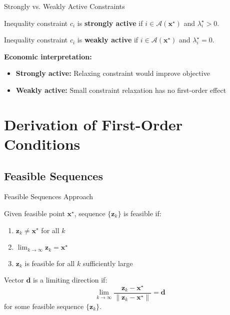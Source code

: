 \documentclass[aspectratio=1610]{beamer}
\begin{document}
\begin{frame}{Strongly vs. Weakly Active Constraints}
  \begin{definition}
    Inequality constraint $c_i$ is \textbf{strongly active} if $i \in \mathcal{A}(\mathbf{x}^{\star})$ and $\lambda_i^{\star} > 0$.
  \end{definition}
  
  \begin{definition}
    Inequality constraint $c_i$ is \textbf{weakly active} if $i \in \mathcal{A}(\mathbf{x}^{\star})$ and $\lambda_i^{\star} = 0$.
  \end{definition}
  
  \vspace{0.5cm}
  \textbf{Economic interpretation:}
  \begin{itemize}
    \item \textbf{Strongly active:} Relaxing constraint would improve objective
    \item \textbf{Weakly active:} Small constraint relaxation has no first-order effect
  \end{itemize}
\end{frame}

\section{Derivation of First-Order Conditions}
\subsection{Feasible Sequences}
\begin{frame}{Feasible Sequences Approach}
  \begin{definition}
    Given feasible point $\mathbf{x}^{\star}$, sequence $\{\mathbf{z}_k\}$ is feasible if:
    \begin{enumerate}
      \item $\mathbf{z}_k \neq \mathbf{x}^{\star}$ for all $k$
      \item $\lim_{k \to \infty} \mathbf{z}_k = \mathbf{x}^{\star}$  
      \item $\mathbf{z}_k$ is feasible for all $k$ sufficiently large
    \end{enumerate}
  \end{definition}
  
  \begin{definition}
    Vector $\mathbf{d}$ is a limiting direction if:
    $$\lim_{k \to \infty} \frac{\mathbf{z}_k - \mathbf{x}^{\star}}{\|\mathbf{z}_k - \mathbf{x}^{\star}\|} = \mathbf{d}$$
    for some feasible sequence $\{\mathbf{z}_k\}$.
  \end{definition}
\end{frame}
\end{document}
